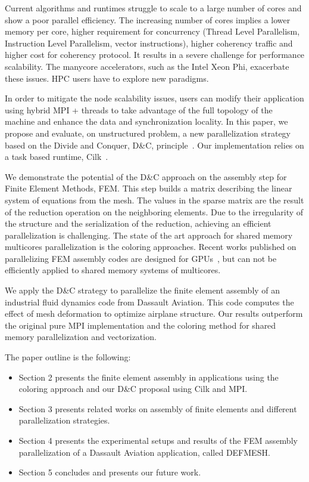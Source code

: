 \documentclass{IOS-Book-Article}
\begin{document}
Current algorithms and runtimes struggle to scale to a large number of cores and show a poor parallel efficiency. 
 The increasing number of cores implies a lower memory per core, higher requirement for concurrency (Thread Level Parallelism, Instruction Level Parallelism, vector instructions),
higher coherency traffic and higher cost for coherency protocol.
It results in a severe challenge for performance scalability. The manycore accelerators, such as the Intel Xeon Phi, exacerbate these issues.
HPC users have to explore new paradigms.

In order to mitigate the node scalability issues, users can modify their application using hybrid MPI + threads to take advantage of the full topology of the machine
and enhance the data and synchronization locality.
In this paper, we propose and evaluate, on unstructured problem, a new parallelization strategy  based on the Divide and Conquer, D\&C, principle~\cite{dc_specfem}. Our implementation relies on a task based runtime,
Cilk~\cite{cilk5}. 

We demonstrate the potential of the D\&C approach on the assembly step for Finite Element Methods, FEM.
This step builds a matrix describing the linear system of equations from the mesh.
The values in the sparse matrix are the result  of the reduction operation on the neighboring elements.
Due to the irregularity of the structure and the serialization of the reduction, achieving an efficient parallelization is challenging. 
The state of the art approach for shared memory multicores parallelization is the coloring approaches.
Recent works published on parallelizing FEM assembly codes
are designed for GPUs~\cite{cecka2011assembly,CPUGPUasm}, but can not be efficiently applied to shared memory systems of multicores.

We apply the D\&C strategy to parallelize the finite element assembly of an industrial fluid dynamics code from Dassault Aviation.
This code computes the effect of mesh deformation to optimize airplane structure.
Our results outperform the original pure MPI implementation and the coloring method for shared memory parallelization and vectorization.

The paper outline is the following:
\begin{itemize}
\item Section 2 presents the finite element assembly in applications using the coloring approach and our D\&C proposal using Cilk and MPI.
\item Section 3 presents related works on assembly of finite elements and different parallelization strategies.
\item Section 4 presents the experimental setups and results of the FEM assembly parallelization of a Dassault Aviation application, called DEFMESH.
\item Section 5 concludes and presents our future work.
\end{itemize}
\end{document}
